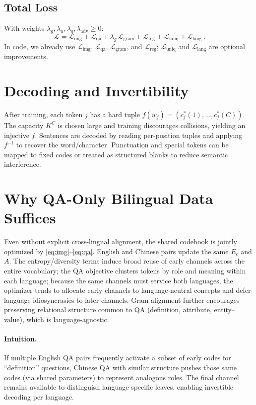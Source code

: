 \documentclass[11pt]{article}
\begin{document}
\subsection{Total Loss}
With weights \(\lambda_g,\lambda_u,\lambda_q,\lambda_{\text{adv}}\ge 0\):
\begin{equation}
  \boxed{\ \mathcal{L}= \mathcal{L}_{\text{img}}+\mathcal{L}_{\text{qa}}+ \lambda_g\,\mathcal{L}_{\text{gram}}+ \mathcal{L}_{\text{reg}}+ \mathcal{L}_{\text{uniq}}+ \mathcal{L}_{\text{lang}}\ }.
\end{equation}
In code, we already use \(\mathcal{L}_{\text{img}}\), \(\mathcal{L}_{\text{qa}}\), \(\mathcal{L}_{\text{gram}}\), and \(\mathcal{L}_{\text{reg}}\); \(\mathcal{L}_{\text{uniq}}\) and \(\mathcal{L}_{\text{lang}}\) are optional improvements.

\section{Decoding and Invertibility}
After training, each token \(j\) has a hard tuple \(f(w_j)=(c^{*}_j(1),\ldots,c^{*}_j(C))\). The capacity \(K^C\) is chosen large and training discourages collisions, yielding an injective \(f\). Sentences are decoded by reading per-position tuples and applying \(f^{-1}\) to recover the word/character. Punctuation and special tokens can be mapped to fixed codes or treated as structured blanks to reduce semantic interference.

\section{Why QA-Only Bilingual Data Suffices}
Even without explicit cross-lingual alignment, the shared codebook is jointly optimized by \eqref{eq:img}--\eqref{eq:qa}. English and Chinese pairs update the same \(E_c\) and \(A\). The entropy/diversity terms induce broad reuse of early channels across the entire vocabulary; the QA objective clusters tokens by role and meaning within each language; because the same channels must service both languages, the optimizer tends to allocate early channels to language-neutral concepts and defer language idiosyncrasies to later channels. Gram alignment further encourages preserving relational structure common to QA (definition, attribute, entity--value), which is language-agnostic.

\paragraph{Intuition.} If multiple English QA pairs frequently activate a subset of early codes for “definition” questions, Chinese QA with similar structure pushes those same codes (via shared parameters) to represent analogous roles. The final channel remains available to distinguish language-specific leaves, enabling invertible decoding per language.
\end{document}
